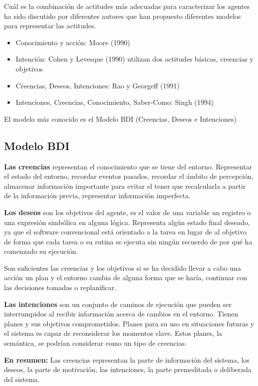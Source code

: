 \documentclass[12pt, twoside, openright]{report} %
\begin{document}
Cuál es la combinación de actitudes más adecuadas para caracterizar los agentes ha sido discutido por diferentes autores que han propuesto diferentes modelos para representar las actitudes.
\begin{itemize}
	\item Conocimiento y acción: Moore (1990)
	\item Intención: Cohen y Levesque (1990) utilizan dos actitudes básicas, creencias y objetivos
	\item Creencias, Deseos, Intenciones: Rao y Georgeff (1991)
	\item Intenciones, Creencias, Conocimiento, Saber-Como: Singh (1994)
\end{itemize}

El modelo más conocido es el Modelo BDI (Creencias, Deseos e Intenciones)

\subsection{Modelo BDI}
\textbf{Las creencias} representan el conocimiento que se tiene del entorno. Representar el estado del entorno, recordar eventos pasados, recordar el ámbito de percepción, almacenar información importante para evitar el tener que recalcularla a partir de la información previa, representar información imperfecta. 

\textbf{Los deseos} son los objetivos del agente, es el valor de una variable un registro o una expresión simbólica en alguna lógica. Representa algún estado final deseado, ya que el software convencional está orientado a la tarea en lugar de al objetivo de forma que cada tarea o su rutina se ejecuta sin ningún recuerdo de por qué ha comenzado su ejecución.

Son suficientes las creencias y los objetivos si se ha decidido llevar a cabo una acción un plan y el entorno cambia de alguna forma que se haría, continuar con las decisiones tomadas o replanificar.

\textbf{Las intenciones} son un conjunto de caminos de ejecución que pueden ser interrumpidos al recibir información acerca de cambios en el entorno. Tienen planes y sus objetivos comprometidos. Planes para su uso en situaciones futuras y el sistema es capaz de reconsiderar los momentos clave. Estos planes, la semántica, se podrían considerar como un tipo de creencias.

\textbf{En resumen:} Las creencias representan la parte de información del sistema, los deseos, la parte de motivación, las intenciones, la parte premeditada o deliberada del sistema.
\end{document}
